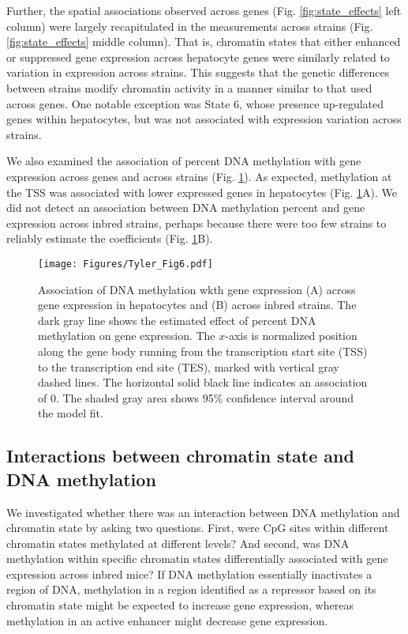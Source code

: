 \documentclass[
  11pt,
]{article}
\begin{document}
Further, the spatial associations observed across genes (Fig.
\ref{fig:state_effects} left column) were largely recapitulated in the
measurements across strains (Fig. \ref{fig:state_effects} middle
column). That is, chromatin states that either enhanced or suppressed
gene expression across hepatocyte genes were similarly related to
variation in expression across strains. This suggests that the genetic
differences between strains modify chromatin activity in a manner
similar to that used across genes. One notable exception was State 6,
whose presence up-regulated genes within hepatocytes, but was not
associated with expression variation across strains.

We also examined the association of percent DNA methylation with gene
expression across genes and across strains (Fig.
\ref{fig:DNA_methylation_effect}). As expected, methylation at the TSS
was associated with lower expressed genes in hepatocytes (Fig.
\ref{fig:DNA_methylation_effect}A). We did not detect an association
between DNA methylation percent and gene expression across inbred
strains, perhaps because there were too few strains to reliably estimate
the coefficients (Fig. \ref{fig:DNA_methylation_effect}B).

\begin{figure}[ht!]
\texttt{[image: Figures/Tyler\_Fig6.pdf]} 
\caption{Association of DNA methylation wkth gene expression (A) across 
gene expression in hepatocytes and (B) across inbred strains. The dark 
gray line shows the estimated effect of percent DNA methylation on gene 
expression. The $x$-axis is normalized position along the gene body 
running from the transcription start site (TSS) to the transcription 
end site (TES), marked with vertical gray dashed lines. The horizontal 
solid black line indicates an association of 0. The shaded gray area shows 
95\% confidence interval around the model fit.}
\label{fig:DNA_methylation_effect}
\end{figure}

\hypertarget{interactions-between-chromatin-state-and-dna-methylation}{%
\subsection{Interactions between chromatin state and DNA
methylation}\label{interactions-between-chromatin-state-and-dna-methylation}}

We investigated whether there was an interaction between DNA methylation
and chromatin state by asking two questions. First, were CpG sites
within different chromatin states methylated at different levels? And
second, was DNA methylation within specific chromatin states
differentially associated with gene expression across inbred mice? If
DNA methylation essentially inactivates a region of DNA, methylation in
a region identified as a repressor based on its chromatin state might be
expected to increase gene expression, whereas methylation in an active
enhancer might decrease gene expression.
\end{document}
